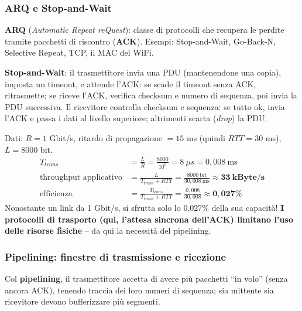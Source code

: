 \documentclass[12pt, a4paper]{article}
\begin{document}
\subsubsection{ARQ e Stop-and-Wait}

\textbf{ARQ} (\textit{Automatic Repeat reQuest}): classe di protocolli che recupera le perdite tramite pacchetti di riscontro (\textbf{ACK}). Esempi: Stop-and-Wait, Go-Back-N, Selective Repeat, TCP, il MAC del WiFi.

\textbf{Stop-and-Wait}: il trasmettitore invia una PDU (mantenendone una copia), imposta un timeout, e attende l'ACK: se scade il timeout senza ACK, ritrasmette; se riceve l'ACK, verifica checksum e numero di sequenza, poi invia la PDU successiva. Il ricevitore controlla checksum e sequenza: se tutto ok, invia l'ACK e passa i dati al livello superiore; altrimenti scarta (\textit{drop}) la PDU.

\begin{tcolorbox}[colback=orange!5, colframe=orange!70!black, title=\textbf{Esercizio 3.1 -- Efficienza di Stop-and-Wait}]
Dati: $R=1$ Gbit/s, ritardo di propagazione $=15$ ms (quindi $RTT=30$ ms), $L=8000$ bit.
\begin{align*}
T_{trans} &= \frac{L}{R} = \frac{8000}{10^9} = 8\ \mu s = 0{,}008\ \text{ms} \\
\text{throughput applicativo} &= \frac{L}{T_{trans}+RTT} = \frac{8000\ \text{bit}}{30{,}008\ \text{ms}} \approx \mathbf{33\ kByte/s} \\
\text{efficienza} &= \frac{T_{trans}}{T_{trans}+RTT} = \frac{0{,}008}{30{,}008} \approx \mathbf{0{,}027\%}
\end{align*}
Nonostante un link da 1 Gbit/s, si sfrutta solo lo 0,027\% della sua capacità! \textbf{I protocolli di trasporto (qui, l'attesa sincrona dell'ACK) limitano l'uso delle risorse fisiche} -- da qui la necessità del pipelining.
\end{tcolorbox}

\subsubsection{Pipelining: finestre di trasmissione e ricezione}

Col \textbf{pipelining}, il trasmettitore accetta di avere più pacchetti ``in volo'' (senza ancora ACK), tenendo traccia dei loro numeri di sequenza; sia mittente sia ricevitore devono bufferizzare più segmenti.
\end{document}
